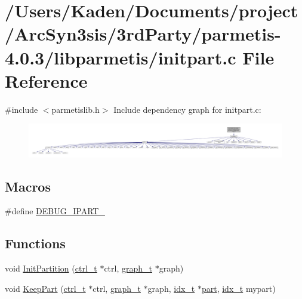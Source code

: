 \hypertarget{a00906}{}\section{/\+Users/\+Kaden/\+Documents/project/\+Arc\+Syn3sis/3rd\+Party/parmetis-\/4.0.3/libparmetis/initpart.c File Reference}
\label{a00906}
{\ttfamily \#include $<$parmetislib.\+h$>$}\newline
Include dependency graph for initpart.\+c\+:\nopagebreak
\begin{figure}[H]
\begin{center}
\leavevmode
\includegraphics[width=350pt]{a00907}
\end{center}
\end{figure}
\subsection*{Macros}
\begin{DoxyCompactItemize}
\item 
\#define \hyperlink{a00906_a1492f936447ebd68489d4ca456ffadef}{D\+E\+B\+U\+G\+\_\+\+I\+P\+A\+R\+T\+\_\+}
\end{DoxyCompactItemize}
\subsection*{Functions}
\begin{DoxyCompactItemize}
\item 
void \hyperlink{a00906_a4f81933eb72b55ead373c63f410e15dd}{Init\+Partition} (\hyperlink{a00742}{ctrl\+\_\+t} $\ast$ctrl, \hyperlink{a00734}{graph\+\_\+t} $\ast$graph)
\item 
void \hyperlink{a00906_a6986183d22bd650674c52d23db011f63}{Keep\+Part} (\hyperlink{a00742}{ctrl\+\_\+t} $\ast$ctrl, \hyperlink{a00734}{graph\+\_\+t} $\ast$graph, \hyperlink{a00876_aaa5262be3e700770163401acb0150f52}{idx\+\_\+t} $\ast$\hyperlink{a00879_a0a9ea8670f88d6db1e021fee2dcd94be}{part}, \hyperlink{a00876_aaa5262be3e700770163401acb0150f52}{idx\+\_\+t} mypart)
\end{DoxyCompactItemize}


